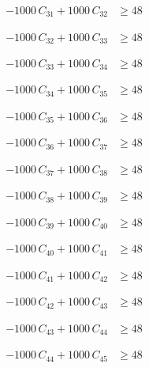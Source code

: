 \documentclass[a4paper,11pt]{article}
\begin{document}
\begin{align}
-1000\,C_{31} + 1000\,C_{32} &\geq 48 \nonumber
\end{align}

\begin{align}
-1000\,C_{32} + 1000\,C_{33} &\geq 48 \nonumber
\end{align}

\begin{align}
-1000\,C_{33} + 1000\,C_{34} &\geq 48 \nonumber
\end{align}

\begin{align}
-1000\,C_{34} + 1000\,C_{35} &\geq 48 \nonumber
\end{align}

\begin{align}
-1000\,C_{35} + 1000\,C_{36} &\geq 48 \nonumber
\end{align}

\begin{align}
-1000\,C_{36} + 1000\,C_{37} &\geq 48 \nonumber
\end{align}

\begin{align}
-1000\,C_{37} + 1000\,C_{38} &\geq 48 \nonumber
\end{align}

\begin{align}
-1000\,C_{38} + 1000\,C_{39} &\geq 48 \nonumber
\end{align}

\begin{align}
-1000\,C_{39} + 1000\,C_{40} &\geq 48 \nonumber
\end{align}

\begin{align}
-1000\,C_{40} + 1000\,C_{41} &\geq 48 \nonumber
\end{align}

\begin{align}
-1000\,C_{41} + 1000\,C_{42} &\geq 48 \nonumber
\end{align}

\begin{align}
-1000\,C_{42} + 1000\,C_{43} &\geq 48 \nonumber
\end{align}

\begin{align}
-1000\,C_{43} + 1000\,C_{44} &\geq 48 \nonumber
\end{align}

\begin{align}
-1000\,C_{44} + 1000\,C_{45} &\geq 48 \nonumber
\end{align}
\end{document}
